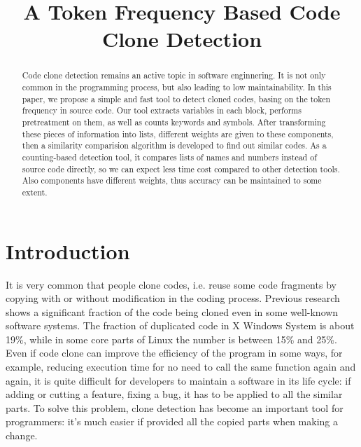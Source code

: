 \documentclass[conference]{IEEEtran}
\begin{document}
\title{A Token Frequency Based Code Clone Detection}

\author{
}

\maketitle


\begin{abstract}
Code clone detection remains an active topic in software enginnering. It is not only common in the programming process, but also leading to low maintainability. 
In this paper, we propose a simple and fast tool to detect cloned codes, basing on the token frequency in source code. Our tool extracts variables in each block, performs pretreatment on them, as well as counts keywords and symbols. After transforming these pieces of information into lists, different weights are given to these components, then a similarity comparision algorithm is developed to find out similar codes. 
As a counting-based detection tool, it compares lists of names and numbers instead of source code directly, so we can expect less time cost compared to other detection tools. Also components have different weights, thus accuracy can be maintained to some extent.
\end{abstract}

\section{Introduction}

It is very common that people clone codes, i.e. reuse some code fragments by copying with or without modification in the coding process. 
Previous research shows a significant fraction of the code being cloned even in some well-known software systems. The fraction of duplicated code in X Windows System is about 19\%, while in some core parts of Linux the number is between 15\% and 25\%. 
Even if code clone can improve the efficiency of the program in some ways, for example, reducing execution time for no need to call the same function again and again, it is quite difficult for developers to maintain a software in its life cycle: if adding or cutting a feature, fixing a bug, it has to be applied to all the similar parts. To solve this problem, clone detection has become an important tool for programmers: it's much easier if provided all the copied parts when making a change.
\end{document}
